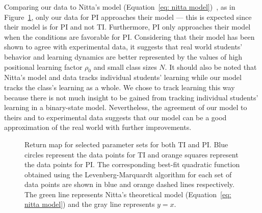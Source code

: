 \documentclass[twocolumn,secnumarabic,amssymb, nobibnotes, aps, prd]{revtex4-2}
\begin{document}
        Comparing our data to Nitta's model (Equation~\ref{eq: nitta model})~\cite{nitta2019mathematical}, as in Figure~\ref{fig:Return map}, only our data for PI approaches their model --- this is expected since their model is for PI and not TI.
        Furthermore, PI only approaches their model when the conditions are favorable for PI.
        Considering that their model has been shown to agree with experimental data, it suggests that real world students' behavior and learning dynamics are better represented by the values of high positional learning factor $\rho_0$ and small class sizes $N$.
        It should also be noted that Nitta's model and data tracks individual students' learning while our model tracks the class's learning as a whole.
        We chose to track learning this way because there is not much insight to be gained from tracking individual students' learning in a binary-state model.
        Nevertheless, the agreement of our model to theirs and to experimental data suggests that our model can be a good approximation of the real world with further improvements.

        \begin{figure}[htbp!]
            \centering
            \caption{Return map for selected parameter sets for both TI and PI.
            Blue circles represent the data points for TI and orange squares represent the data points for PI.
            The corresponding best-fit quadratic function obtained using the Levenberg-Marquardt algorithm for each set of data points are shown in blue and orange dashed lines respectively.
            The green line represents Nitta's theoretical model (Equation~\ref{eq: nitta model}) and the gray line represents $y=x$.}
            \label{fig:Return map}
        \end{figure}
        
\end{document}
